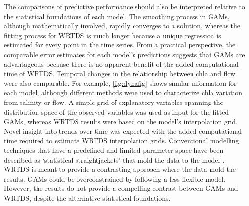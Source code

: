 \documentclass[letterpaper,12pt,oneside]{article}\usepackage[]{graphicx}\usepackage[]{color}
\begin{document}
The comparisons of predictive performance should also be interpreted relative to the statistical foundations of each model.  The smoothing process in \acp{GAM}, although mathematically involved, rapidly converges to a solution, whereas the fitting process for \ac{WRTDS} is much longer because a unique regression is estimated for every point in the time series.  From a practical perspective, the comparable error estimates for each model's predictions suggests that \acp{GAM} are advantageous because there is no apparent benefit of the added computational time of \ac{WRTDS}.  Temporal changes in the relationship between \ac{chla} and flow were also comparable.  For example, \cref{fig:dynafig} shows similar information for each model, although different methods were used to characterize \ac{chla} variation from salinity or flow.  A simple grid of explanatory variables spanning the distribution space of the observed variables was used as input for the fitted \acp{GAM}, whereas \ac{WRTDS} results were based on the model's interpolation grid.  Novel insight into trends over time was expected with the added computational time required to estimate \ac{WRTDS} interpolation grids.  Conventional modelling techniques that have a predefined and limited parameter space have been described as `statistical straightjackets' that mold the data to the model \citep{Hirsch14b}.  \ac{WRTDS} is meant to provide a contrasting approach where the data mold the results. \acp{GAM} could be overconstrained by following a less flexible model.  However, the results do not provide a compelling contrast between \acp{GAM} and \ac{WRTDS}, despite the alternative statistical foundations.  
\end{document}
